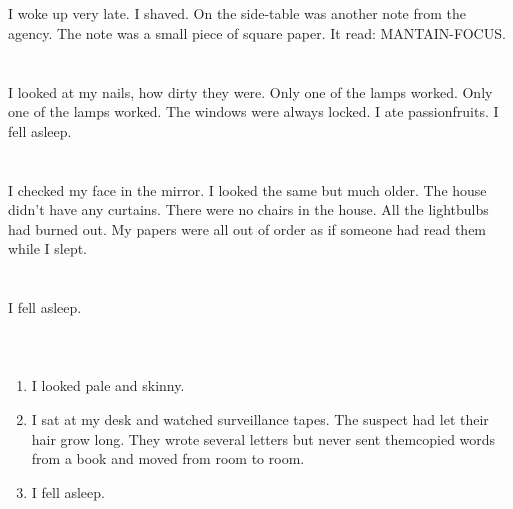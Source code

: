 \documentclass{article}
\begin{document}
    \section{}
    I woke up very late. I shaved. On the side-table was another note from the agency. The note was a small piece of square paper. It read: MANTAIN-FOCUS.  
    \newpage
    
    \section{}
    I looked at my nails, how dirty they were. Only one of the lamps worked. Only one of the lamps worked. The windows were always locked. I ate passionfruits. I fell asleep.  
    \newpage
    
    \section{}
    I checked my face in the mirror. I looked the same but much older. The house didn't have any curtains. There were no chairs in the house. All the lightbulbs had burned out. My papers were all out of order as if someone had read them while I slept.  
    \newpage
    
    \section{}
    I fell asleep.\\\\ 
    \newpage
    
    \section{}
    
    \begin{enumerate}
    
    \item I looked pale and skinny.\\
    
    \item I sat at my desk and watched surveillance tapes. The suspect had let their hair grow long. They wrote several letters but never sent themcopied words from a book and moved from room to room.\\
    
    \item I fell asleep.\\
    
    \end{enumerate}
     
\end{document}
